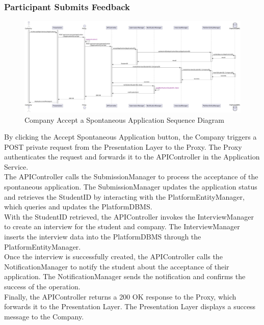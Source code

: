 \subsubsection*{Participant Submits Feedback}
\begin{figure}[H]
    \centering
    \includegraphics[width=\linewidth]{Latex/Images/DD/SequenceDiagrams/8CompanyAcceptsSpontaneousApplication.png}
    \caption{Company Accept a Spontaneous Application Sequence Diagram}
    \label{fig:compaccspontapp}
\end{figure}
By clicking the Accept Spontaneous Application button, the Company triggers a POST private request from the Presentation Layer to the Proxy. The Proxy authenticates the request and forwards it to the APIController in the Application Service.\\
The APIController calls the SubmissionManager to process the acceptance of the spontaneous application. The SubmissionManager updates the application status and retrieves the StudentID by interacting with the PlatformEntityManager, which queries and updates the PlatformDBMS.\\
With the StudentID retrieved, the APIController invokes the InterviewManager to create an interview for the student and company. The InterviewManager inserts the interview data into the PlatformDBMS through the PlatformEntityManager.\\
Once the interview is successfully created, the APIController calls the NotificationManager to notify the student about the acceptance of their application. The NotificationManager sends the notification and confirms the success of the operation.\\
Finally, the APIController returns a 200 OK response to the Proxy, which forwards it to the Presentation Layer. The Presentation Layer displays a success message to the Company.

